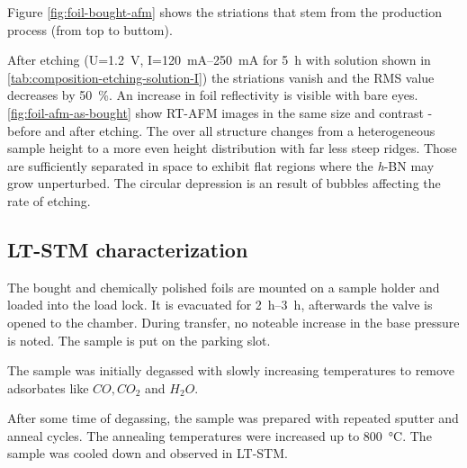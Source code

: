	Figure \ref{fig:foil-bought-afm} shows the striations that stem from the production process (from top to buttom).
	
	After etching (U=\SI{1.2}{\volt}, I=\SIrange{120}{250}{\mA} for \SI{5}{\hour} with solution shown in \autoref{tab:composition-etching-solution-I}) the striations vanish and the RMS value decreases by \SI{50}{\percent}. An increase in foil reflectivity is visible with bare eyes. \autoref{fig:foil-afm-as-bought} show RT-AFM images in the same size and contrast - before  and after  etching.
	The over all structure changes from a heterogeneous sample height to a more even height distribution with far less steep ridges. Those are sufficiently separated in space to exhibit flat regions where the \textit{h}-BN may grow unperturbed. The circular depression is an result of bubbles affecting the rate of etching.
	
\subsection{LT-STM characterization}
\label{section:foil-STM}
The bought and chemically polished foils are mounted on a sample holder and loaded into the load lock. It is evacuated for \SIrange{2}{3}{\hour}, afterwards the valve is opened to the chamber. During transfer, no noteable increase in the base pressure is noted. The sample is put on the parking slot.
		
The sample was initially degassed with slowly increasing temperatures to remove adsorbates like $CO, CO_2$ and $H_2O$.
		
After some time of degassing, the sample was prepared with repeated sputter and anneal cycles. The annealing temperatures were increased up to \SI{800}{\degreeCelsius}. 
The sample was cooled down and observed in LT-STM.
		
